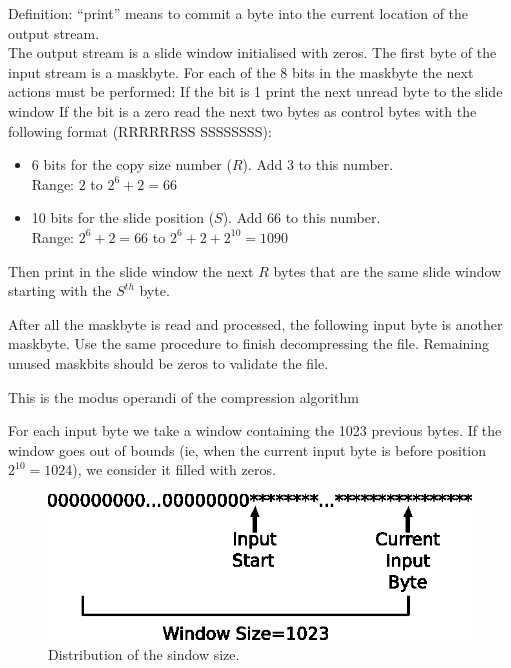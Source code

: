 \documentclass{article}
\begin{document}
 Definition: ``print'' means to commit a byte into the current location
             of the output stream.\\

 The output stream is a slide window initialised with zeros.
 The first byte of the input stream is a maskbyte.
 For each of the 8 bits in the maskbyte the next actions must be performed:
  If the bit is 1 print the next unread byte to the slide window
  If the bit is a zero read the next two bytes as control bytes with the
  following format (RRRRRRSS SSSSSSSS):
\begin{itemize}
\item 6  bits for the copy size number ($R$). Add 3 to this number.\\
        Range: $2$ to $2^6+2=66$
\item 10 bits for the slide position ($S$). Add 66 to this number.\\
        Range: $2^6+2=66$ to $2^6+2+2^{10}=1090$
\end{itemize}
   Then print in the slide window the next $R$ bytes that are the same slide
   window starting with the $S^{th}$ byte.

 After all the maskbyte is read and processed, the following input byte is
 another maskbyte. Use the same procedure to finish decompressing the file.
 Remaining unused maskbits should be zeros to validate the file.

 This is the modus operandi of the compression algorithm

 For each input byte we take a window containing the 1023 previous bytes.
 If the window goes out of bounds (ie, when the current input byte is
 before position $2^{10}=1024$), we consider it filled with zeros.

\begin{figure}[h]
\centerline{\includegraphics{lzg.eps}}
\caption{Distribution of the sindow size.}
\end{figure}
\end{document}
